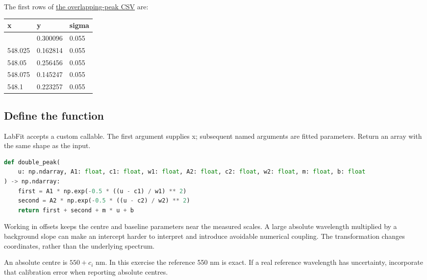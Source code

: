 \documentclass[
  british,
  10pt,
  a4paper,
]{article}
\begin{document}
The first rows of \href{data/double_peak.csv}{the overlapping-peak CSV}
are:

\begin{longtable}[]{@{}lll@{}}
\toprule\noalign{}
x & y & sigma \\
\midrule\noalign{}
\endhead
\bottomrule\noalign{}
\endlastfoot
548 & 0.300096 & 0.055 \\
548.025 & 0.162814 & 0.055 \\
548.05 & 0.256456 & 0.055 \\
548.075 & 0.145247 & 0.055 \\
548.1 & 0.223257 & 0.055 \\
\end{longtable}


\subsection{Define the function}\label{define-the-function}

LabFit accepts a custom callable. The first argument supplies x;
subsequent named arguments are fitted parameters. Return an array with
the same shape as the input.

\par\noindent\begin{minipage}{\linewidth}

\begin{lstlisting}[language=Python]
def double_peak(
    u: np.ndarray, A1: float, c1: float, w1: float, A2: float, c2: float, w2: float, m: float, b: float
) -> np.ndarray:
    first = A1 * np.exp(-0.5 * ((u - c1) / w1) ** 2)
    second = A2 * np.exp(-0.5 * ((u - c2) / w2) ** 2)
    return first + second + m * u + b
\end{lstlisting}

\end{minipage}\par

Working in offsets keeps the centre and baseline parameters near the
measured scales. A large absolute wavelength multiplied by a background
slope can make an intercept harder to interpret and introduce avoidable
numerical coupling. The transformation changes coordinates, rather than
the underlying spectrum.

An absolute centre is \(550+c_i\) nm. In this exercise the reference 550
nm is exact. If a real reference wavelength has uncertainty, incorporate
that calibration error when reporting absolute centres.
\end{document}
